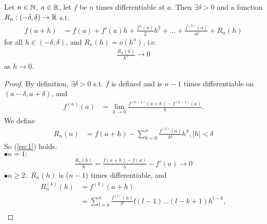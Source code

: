 \documentclass[a4paper]{article}
\begin{document}
\begin{thm}
Let $n\in \mathbb{N}$, $a\in \mathbb{R}$, let $f$ be $n$ times differentiable at $a$. Then $\exists \delta > 0$ and a function $R_n:\left(-\delta,\delta\right)\to\mathbb{R}$ s.t.
\begin{equation}\label{eq:1}
\begin{aligned}
f\left(a+h\right)&=f\left(a\right)+f'\left(a\right)h + \frac{f''\left(a\right)}{2}h^2 + ... + \frac{f^{\left(n\right)}\left(a\right)}{n!} + R_n\left(h\right)
\end{aligned}
\end{equation}
for all $h\in\left(-\delta,\delta\right)$, and $R_n\left(h\right) = o\left(h^n\right)$, i.e.
\begin{equation*}
\begin{aligned}
\frac{R_n\left(h\right)}{h^n} \to 0
\end{aligned}
\end{equation*}
as $h\to 0$.
\begin{proof}
By definition, $\exists \delta > 0$ s.t. $f$ is defined and is $n-1$ times differentiable on $\left(a-\delta,a+\delta\right)$, and
\begin{equation*}
\begin{aligned}
f^{\left(n\right)}\left(a\right) &= \lim_{h\to 0} \frac{f^{\left(n-1\right)} \left(a+h\right)-f^{\left(n-1\right)} \left(a\right)}{h}.
\end{aligned}
\end{equation*}
We define
\begin{equation*}
\begin{aligned}
R_n\left(n\right) &= f\left(a+h\right)-\sum_{k=0}^n \frac{f^{\left(k\right)} \left(a\right)}{k!}h^k, |h| < \delta
\end{aligned}
\end{equation*}
So (\ref{eq:1}) holds.\\
$\bullet n=1:$
\begin{equation*}
\begin{aligned}
\frac{R_1\left(h\right)}{h} = \frac{f\left(a+h\right)-f\left(a\right)}{h}-f'\left(a\right) \to 0
\end{aligned}
\end{equation*}
$\bullet n\geq 2:$ $R_n\left(h\right)$ is ($n-1$) times differentiable, and
\begin{equation*}
\begin{aligned}
R_n^{\left(k\right)}\left(h\right) &= f^{\left(k\right)}\left(a+h\right)\\
&=\sum_{l=k}^n \frac{f^{\left(l\right)}\left(a\right)}{l!} l\left(l-1\right)...\left(l-k+1\right)h^{l-k},\\

\end{aligned}
\end{equation*}
\end{proof}
\end{thm}
\end{document}
